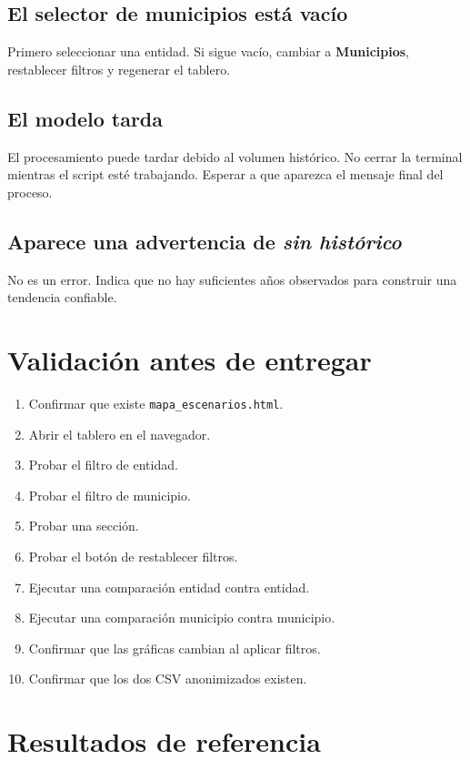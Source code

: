 \documentclass[11pt,a4paper]{article}
\newcommand{\ruta}[1]{\texttt{\small #1}}
\begin{document}
\subsection{El selector de municipios está vacío}

Primero seleccionar una entidad. Si sigue vacío, cambiar a \textbf{Municipios}, restablecer filtros y regenerar el tablero.

\subsection{El modelo tarda}

El procesamiento puede tardar debido al volumen histórico. No cerrar la terminal mientras el script esté trabajando. Esperar a que aparezca el mensaje final del proceso.

\subsection{Aparece una advertencia de \textit{sin histórico}}

No es un error. Indica que no hay suficientes años observados para construir una tendencia confiable.

\section{Validación antes de entregar}

\begin{enumerate}
    \item Confirmar que existe \ruta{mapa\_escenarios.html}.
    \item Abrir el tablero en el navegador.
    \item Probar el filtro de entidad.
    \item Probar el filtro de municipio.
    \item Probar una sección.
    \item Probar el botón de restablecer filtros.
    \item Ejecutar una comparación entidad contra entidad.
    \item Ejecutar una comparación municipio contra municipio.
    \item Confirmar que las gráficas cambian al aplicar filtros.
    \item Confirmar que los dos CSV anonimizados existen.
\end{enumerate}

\section{Resultados de referencia}
\end{document}
